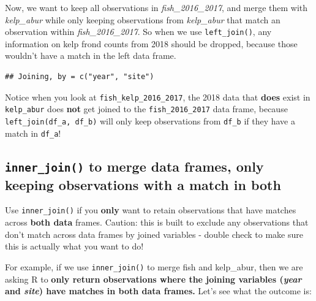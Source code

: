\documentclass[]{book}
\newenvironment{Shaded}{\begin{snugshade}}{\end{snugshade}}
\newcommand{\DecValTok}[1]{\textcolor[rgb]{0.00,0.00,0.81}{#1}}
\newcommand{\KeywordTok}[1]{\textcolor[rgb]{0.13,0.29,0.53}{\textbf{#1}}}
\newcommand{\NormalTok}[1]{#1}
\newcommand{\OperatorTok}[1]{\textcolor[rgb]{0.81,0.36,0.00}{\textbf{#1}}}
\newcommand{\StringTok}[1]{\textcolor[rgb]{0.31,0.60,0.02}{#1}}
\begin{document}
Now, we want to keep all observations in \emph{fish\_2016\_2017}, and merge them with \emph{kelp\_abur} while only keeping observations from \emph{kelp\_abur} that match an observation within \emph{fish\_2016\_2017}. So when we use \texttt{left\_join()}, any information on kelp frond counts from 2018 should be dropped, because those wouldn't have a match in the left data frame.

\begin{Shaded}
\end{Shaded}

\begin{verbatim}
## Joining, by = c("year", "site")
\end{verbatim}

Notice when you look at \texttt{fish\_kelp\_2016\_2017}, the 2018 data that \textbf{does} exist in \texttt{kelp\_abur} does \textbf{not} get joined to the \texttt{fish\_2016\_2017} data frame, because \texttt{left\_join(df\_a,\ df\_b)} will only keep observations from \texttt{df\_b} if they have a match in \texttt{df\_a}!

\hypertarget{inner_join-to-merge-data-frames-only-keeping-observations-with-a-match-in-both}{%
\subsection{\texorpdfstring{\texttt{inner\_join()} to merge data frames, only keeping observations with a match in \textbf{both}}{inner\_join() to merge data frames, only keeping observations with a match in both}}\label{inner_join-to-merge-data-frames-only-keeping-observations-with-a-match-in-both}}

Use \texttt{inner\_join()} if you \textbf{only} want to retain observations that have matches across \textbf{both data} frames. Caution: this is built to exclude any observations that don't match across data frames by joined variables - double check to make sure this is actually what you want to do!

For example, if we use \texttt{inner\_join()} to merge fish and kelp\_abur, then we are asking R to \textbf{only return observations where the joining variables (\emph{year} and \emph{site}) have matches in both data frames.} Let's see what the outcome is:
\end{document}
